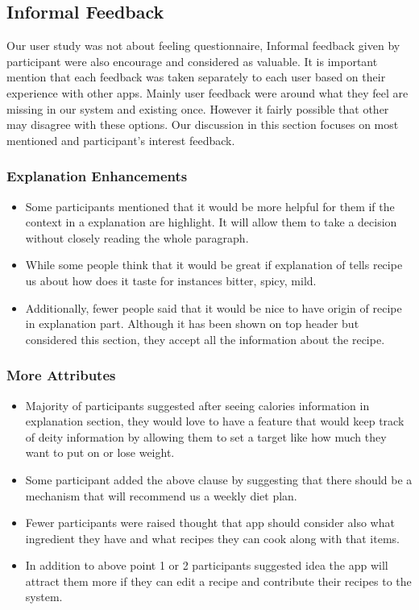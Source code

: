 \subsection{Informal Feedback}
Our user study was not about feeling questionnaire, Informal feedback given by participant were also encourage and considered as valuable. It is important mention that each feedback was taken separately to each user based on their experience with other apps. Mainly user feedback were around what they feel are missing in our system and existing once. However it fairly possible that other may disagree with these options. Our discussion in this section focuses on most mentioned and participant’s interest feedback. \newline
\subsubsection{Explanation Enhancements}
 	\begin{itemize}
 		\item Some participants mentioned that it would be more helpful for them if the context in a explanation are highlight. It will allow them to take a decision without closely reading the whole paragraph.
 		
 		\item  While some people think that it would be great if explanation of tells recipe us about how does it taste for instances bitter, spicy, mild. 
 		
 		 \item Additionally, fewer people said that it would be nice to have origin of recipe in explanation part. Although it has been shown on top header but considered this section, they accept all the information about the recipe. 
 	\end{itemize}
 	
\subsubsection{More Attributes}
	\begin{itemize}
		\item Majority of participants suggested after seeing calories information in explanation section, they would love to have a feature that would keep track of deity information by allowing them to set a target like how much they want to put on or lose weight.
		 
		 \item Some participant added the above clause by suggesting that there should be a mechanism that will recommend us a weekly diet plan.
		 
		 \item Fewer participants were raised thought that app should consider also what ingredient they have and what recipes they can cook along with that items. 
		\item In addition to above point 1 or 2 participants suggested idea the app will attract them more if they can edit a recipe and contribute their recipes to the system. 
	\end{itemize}
